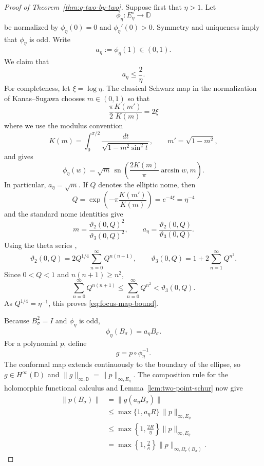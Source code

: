 \documentclass[11pt]{article}
\theoremstyle{remark}
\begin{document}
\begin{proof}[Proof of Theorem~\ref{thm:q-two-by-two}]
Suppose first that \(\eta>1\).  Let
\[
  \phi_\eta:E_\eta^\circ\longrightarrow\mathbb D
\]
be normalized by \(\phi_\eta(0)=0\) and
\(\phi_\eta'(0)>0\).  Symmetry and uniqueness imply that
\(\phi_\eta\) is odd.  Write
\[
  a_\eta:=\phi_\eta(1)\in(0,1).
\]
We claim that
\begin{equation}
\label{eq:focus-map-bound}
  a_\eta\leq\frac{2}{\eta}.
\end{equation}
For completeness, let \(\xi=\log\eta\).  The classical Schwarz map in
the normalization of Kanas--Sugawa
\cite[Equation~(2.1) and the inverse formula following it]
{KanasSugawa2006} chooses \(m\in(0,1)\) so that
\[
  \frac{\pi}{2}\frac{K(m')}{K(m)}=2\xi
\]
where we use the modulus convention
\[
 K(m)=\int_0^{\pi/2}\frac{dt}{\sqrt{1-m^2\sin^2t}},
 \qquad m'=\sqrt{1-m^2},
\]
and gives
\[
  \phi_\eta(w)
  =
  \sqrt m\,
  \operatorname{sn}\left(
     \frac{2K(m)}{\pi}\arcsin w,m
  \right).
\]
In particular, \(a_\eta=\sqrt m\).  If \(Q\) denotes the elliptic
nome, then
\[
  Q=\exp\left(-\pi\frac{K(m')}{K(m)}\right)
   =e^{-4\xi}=\eta^{-4}
\]
and the standard nome identities
\cite[Equations~22.2.1--22.2.2]{DLMF}
give
\[
  m=\frac{\vartheta_2(0,Q)^2}{\vartheta_3(0,Q)^2},
  \qquad
  a_\eta
  =\frac{\vartheta_2(0,Q)}{\vartheta_3(0,Q)}.
\]
Using the theta series
\cite[Equations~20.2.2--20.2.3]{DLMF},
\[
  \vartheta_2(0,Q)
  =2Q^{1/4}\sum_{n=0}^{\infty}Q^{n(n+1)},
  \qquad
  \vartheta_3(0,Q)
  =1+2\sum_{n=1}^{\infty}Q^{n^2}.
\]
Since \(0<Q<1\) and \(n(n+1)\geq n^2\),
\[
  \sum_{n=0}^{\infty}Q^{n(n+1)}
  \leq
  \sum_{n=0}^{\infty}Q^{n^2}
  <\vartheta_3(0,Q).
\]
As \(Q^{1/4}=\eta^{-1}\), this proves
\eqref{eq:focus-map-bound}.

Because \(B_\sigma^2=I\) and \(\phi_\eta\) is odd,
\[
  \phi_\eta(B_\sigma)=a_\eta B_\sigma.
\]
For a polynomial \(p\), define
\[
  g=p\circ\phi_\eta^{-1}.
\]
The conformal map extends continuously to the boundary of the ellipse,
so \(g\in H^\infty(\mathbb D)\) and
\(\|g\|_{\infty,\mathbb D}=\|p\|_{\infty,E_\eta}\).
The composition rule for the holomorphic functional calculus and
Lemma~\ref{lem:two-point-schur} now give
\begin{align*}
  \|p(B_\sigma)\|
  &=\|g(a_\eta B_\sigma)\|\\
  &\leq
  \max\{1,a_\eta R\}\,
  \|p\|_{\infty,E_\eta}\\
  &\leq
  \max\left\{1,\frac{2R}{\eta}\right\}
  \|p\|_{\infty,E_\eta}\\
  &=
  \max\left\{1,\frac{2}{\kappa}\right\}
  \|p\|_{\infty,\Omega_r(B_\sigma)}.
\end{align*}


\end{proof}
\end{document}
